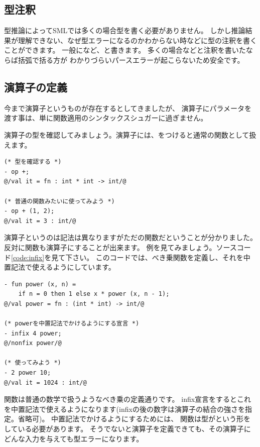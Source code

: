 \documentclass[11pt,a4paper]{article}
\begin{document}
\subsection{型注釈}

型推論によってSMLでは多くの場合型を書く必要がありません。
しかし推論結果が理解できない、なぜ型エラーになるのかわからない時などに型の注釈を書くことができます。
一般になど、と書きます。
多くの場合などと注釈を書いたならば括弧で括る方が
わかりづらいパースエラーが起こらないため安全です。

\subsection{演算子の定義}
今まで演算子というものが存在するとしてきましたが、
演算子にパラメータを渡す事は、単に関数適用のシンタックスシュガーに過ぎません。

演算子の型を確認してみましょう。演算子には、をつけると通常の関数として扱えます。
\begin{lstlisting}[caption=演算子を評価する]
(* 型を確認する *)
- op +;
@/val it = fn : int * int -> int/@

(* 普通の関数みたいに使ってみよう *)
- op + (1, 2);
@/val it = 3 : int/@
\end{lstlisting}

演算子というのは記法は異なりますがただの関数だということが分かりました。
反対に関数も演算子にすることが出来ます。
例を見てみましょう。ソースコード\ref{code:infix}を見て下さい。
このコードでは、べき乗関数を定義し、それを中置記法で使えるようにしています。

\begin{lstlisting}[caption=演算子の定義,label=code:infix]
- fun power (x, n) =
    if n = 0 then 1 else x * power (x, n - 1);
@/val power = fn : (int * int) -> int/@

(* powerを中置記法でかけるようにする宣言 *)
- infix 4 power;
@/nonfix power/@

(* 使ってみよう *)
- 2 power 10;
@/val it = 1024 : int/@
\end{lstlisting}

関数は普通の数学で扱うようなべき乗の定義通りです。
infix宣言をするとこれを中置記法で使えるようになります(infixの後の数字は演算子の結合の強さを指定。省略可)。
中置記法でかけるようにするためには、
関数は型がという形をしている必要があります。
そうでないと演算子を定義できても、その演算子にどんな入力を与えても型エラーになります。
\end{document}

